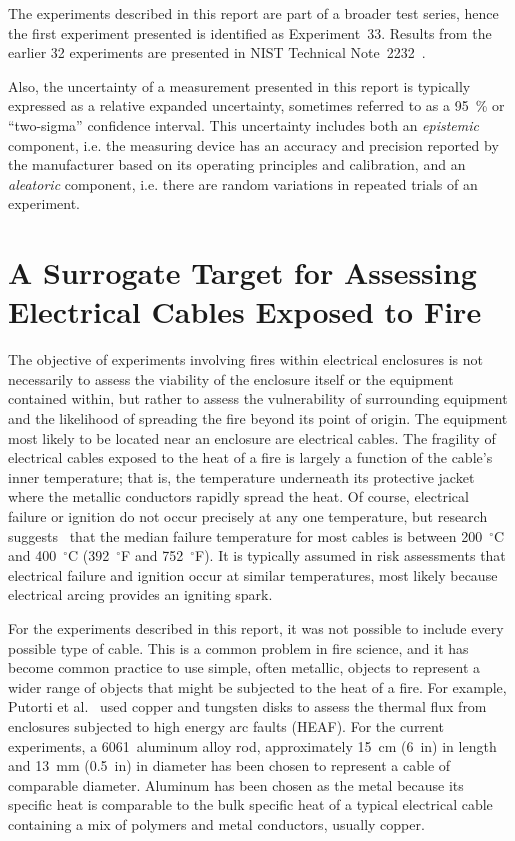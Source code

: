 The experiments described in this report are part of a broader test series, hence the first experiment presented is identified as Experiment~33. Results from the earlier 32 experiments are presented in NIST Technical Note~2232~\cite{OLIVE-FIRE}.

Also, the uncertainty of a measurement presented in this report is typically expressed as a relative expanded uncertainty, sometimes referred to as a 95~\% or ``two-sigma'' confidence interval. This uncertainty includes both an {\em epistemic} component, i.e. the measuring device has an accuracy and precision reported by the manufacturer based on its operating principles and calibration, and an {\em aleatoric} component, i.e. there are random variations in repeated trials of an experiment.

\clearpage

\section{A Surrogate Target for Assessing Electrical Cables Exposed to Fire}
\label{cable_surrogate}

The objective of experiments involving fires within electrical enclosures is not necessarily to assess the viability of the enclosure itself or the equipment contained within, but rather to assess the vulnerability of surrounding equipment and the likelihood of spreading the fire beyond its point of origin. The equipment most likely to be located near an enclosure are electrical cables. The fragility of electrical cables exposed to the heat of a fire is largely a function of the cable's inner temperature; that is, the temperature underneath its protective jacket where the metallic conductors rapidly spread the heat. Of course, electrical failure or ignition do not occur precisely at any one temperature, but research suggests~\cite{CAROLFIRE} that the median failure temperature for most cables is between 200~$^\circ$C and 400~$^\circ$C (392~$^\circ$F and 752~$^\circ$F). It is typically assumed in risk assessments that electrical failure and ignition occur at similar temperatures, most likely because electrical arcing provides an igniting spark.

For the experiments described in this report, it was not possible to include every possible type of cable. This is a common problem in fire science, and it has become common practice to use simple, often metallic, objects to represent a wider range of objects that might be subjected to the heat of a fire. For example, Putorti et al.~\cite{Putorti:SMIRT23} used copper and tungsten disks to assess the thermal flux from enclosures subjected to high energy arc faults (HEAF). For the current experiments, a 6061~aluminum alloy rod, approximately  15~cm (6~in) in length and 13~mm (0.5~in) in diameter has been chosen to represent a cable of comparable diameter. Aluminum has been chosen as the metal because its specific heat is comparable to the bulk specific heat of a typical electrical cable containing a mix of polymers and metal conductors, usually copper.

